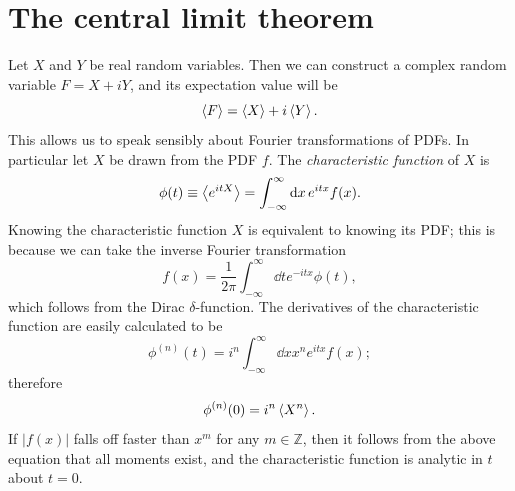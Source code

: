 \section{The central limit theorem}\label{sec:CLT}

Let $X$ and $Y$ be real random variables. Then we can construct a
complex random variable $F=X+iY$, and its expectation value will be
\begin{equation}
  \ev{F}=\ev{X}+i\ev{Y}.
\end{equation}
This allows us to speak sensibly about Fourier transformations of
PDFs. In particular let $X$ be drawn from the PDF $f$.
The {\it characteristic function}
 of $X$ is
\begin{equation}
  \phi(t)\equiv\ev{e^{itX}}=\int_{-\infty}^\infty\dd{x}e^{itx}f(x).
\end{equation}
Knowing the characteristic function $X$ is equivalent to knowing its PDF;
this is because we can take the inverse Fourier transformation
\begin{equation}
  f(x)=\frac{1}{2\pi}\int_{-\infty}^\infty\dd{t}e^{-itx}\phi(t),
\end{equation}
which follows from the Dirac $\delta$-function. The derivatives of the
characteristic function are easily calculated to be
\begin{equation}
  \phi^{(n)}(t)=i^n\int_{-\infty}^\infty\dd{x}x^ne^{itx}f(x);
\end{equation}
therefore
\begin{equation}
  \phi^{(n)}(0)=i^n\ev{X^n}.
\end{equation}
If $|f(x)|$ falls off faster than $x^m$ for any $m\in\mathbb{Z}$, then
it follows from the above equation that all moments exist, and the
characteristic function is analytic in $t$ about $t=0$.

